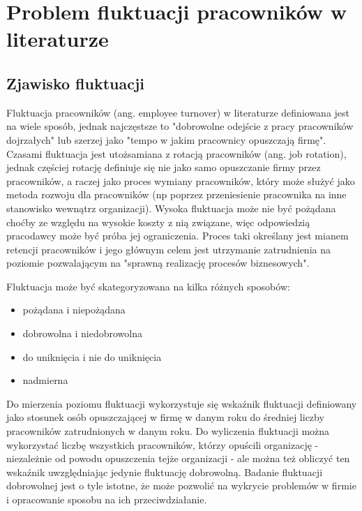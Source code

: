 

\chapter{Problem fluktuacji pracowników w literaturze}\label{ch:knowladge-state}


\section{Zjawisko fluktuacji}\label{sec:employee-turnover}
Fluktuacja pracowników (ang. employee turnover) w literaturze definiowana jest na wiele sposób, jednak najczęstsze to "dobrowolne odejście z pracy pracowników dojrzałych"\cite{wozniak-2016}
lub szerzej jako "tempo w jakim pracownicy opuszczają firmę"\cite{cron-2006}.
Czasami fluktuacja jest utożsamiana z rotacją pracowników (ang. job rotation),
jednak częściej rotację definiuje się nie jako samo opuszczanie firmy przez pracowników, a raczej jako proces wymiany pracowników,
który może służyć jako metoda rozwoju dla pracowników (np poprzez przeniesienie pracownika na inne stanowisko wewnątrz organizacji)\cite{pocztowski-2009}.
Wysoka fluktuacja może nie być pożądana choćby ze względu na wysokie koszty z nią związane\cite{philips-edwards-2009},
więc odpowiedzią pracodawcy może być próba jej ograniczenia.
Proces taki określany jest mianem retencji pracowników i jego głównym celem jest utrzymanie zatrudnienia na poziomie pozwalającym na "sprawną realizację procesów biznesowych"\cite{pocztowski-2007}.

Fluktuacja może być skategoryzowana na kilka różnych sposobów:
\begin{itemize}
    \item pożądana i niepożądana
    \item dobrowolna i niedobrowolna
    \item do uniknięcia i nie do uniknięcia
    \item nadmierna
\end{itemize}

Do mierzenia poziomu fluktuacji wykorzystuje się wskaźnik fluktuacji definiowany jako stosunek osób opuszczającej w firmę w danym roku do średniej liczby pracowników zatrudnionych w danym roku.
Do wyliczenia fluktuacji można wykorzystać liczbę wszystkich pracowników, którzy opuścili organizację - niezależnie od powodu opuszczenia tejże organizacji - ale można też obliczyć ten wskaźnik uwzględniając jedynie fluktuację dobrowolną.
Badanie fluktuacji dobrowolnej jest o tyle istotne, że może pozwolić na wykrycie problemów w firmie i opracowanie sposobu na ich przeciwdziałanie\cite{spychala-2019}.


